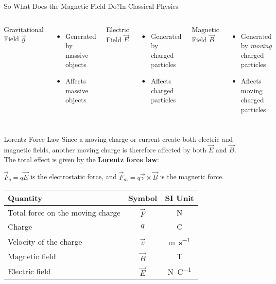 \documentclass[12pt,aspectratio=169]{beamer}
\begin{document}
\begin{frame}{So What Does the Magnetic Field Do?}{In Classical Physics}
  \begin{columns}
    \begin{center}
      Gravitational Field $\vec g$
    \end{center}
    \begin{itemize}
    \item Generated by massive objects
    \item Affects massive objects
    \end{itemize}

    \begin{center}
      Electric Field $\vec E$
    \end{center}
    \begin{itemize}
    \item Generated by charged particles
    \item Affects charged particles
    \end{itemize}

    \begin{center}
      Magnetic Field $\vec B$
    \end{center}
    \begin{itemize}
    \item Generated by \emph{moving} charged particles
    \item Affects moving charged particles
    \end{itemize}
  \end{columns}
\end{frame}



\begin{frame}{Lorentz Force Law}
  Since a moving charge or current create both electric and magnetic fields,
  another moving charge is therefore affected by both $\vec E$ and $\vec B$.
  The total effect is given by the \textbf{Lorentz force law}:


  $\vec F_q=q\vec E$ is the electrostatic force, and
  $\vec F_m=q\vec v\times\vec B$ is the magnetic force.
  \begin{center}
    \begin{tabular}{l|c|c}
      \rowcolor{pink}
      \textbf{Quantity} & \textbf{Symbol} & \textbf{SI Unit} \\ \hline
      Total force on the moving charge & $\vec F$ & \si\newton \\
      Charge                 & $q$      & \si\coulomb \\
      Velocity of the charge & $\vec v$ & \si{\metre\per\second} \\
      Magnetic field         & $\vec B$ & \si\tesla \\
      Electric field         & $\vec E$ & \si{\newton\per\coulomb}
    \end{tabular}
  \end{center}
\end{frame}
\end{document}
